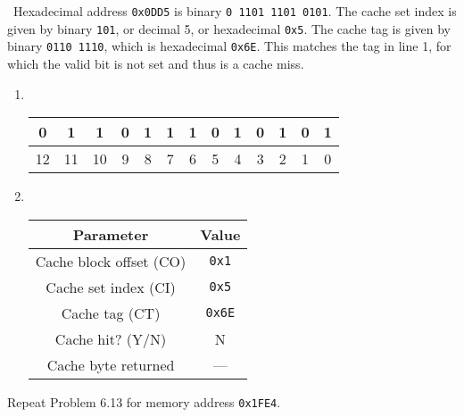 \documentclass[12pt]{article}
\newenvironment{ex}[2][Exercise]{\begin{trivlist}
		\item[\hskip \labelsep {\bfseries #1}\hskip \labelsep {\bfseries #2.}]}{\end{trivlist}}
\newenvironment{sol}[1][Solution]{\begin{trivlist}
		\item[\hskip \labelsep {\bfseries #1:}]}{\end{trivlist}}
\begin{document}
\begin{sol}
	\
	Hexadecimal address \texttt{0x0DD5} is binary \texttt{0 1101 1101 0101}. The cache
	set index is given by binary \texttt{101}, or decimal 5, or hexadecimal \texttt{0x5}.
	The cache tag is given by binary \texttt{0110 1110}, which is hexadecimal \texttt{0x6E}.
	This matches the tag in line 1, for which the valid bit is not set and thus is a cache miss.
	\begin{enumerate}[label=(\alph*)]
		\item \
		\begin{center}
			\begin{tabular}{|c|c|c|c|c|c|c|c|c|c|c|c|c|}
				\hline
				0 & 1 & 1 & 0 & 1 & 1 & 1 & 0 & 1 & 0 & 1 & 0 & 1\\
				\hline
				12 & 11 & 10 & 9 & 8 & 7 & 6 & 5 & 4 & 3 & 2 & 1 & 0
			\end{tabular}
		\end{center}
		\item \
		\begin{center}
			\begin{tabular}{cc}
				Parameter & Value\\
				\hline
				Cache block offset (CO) & \texttt{0x1}\\
				Cache set index (CI) & \texttt{0x5}\\
				Cache tag (CT) & \texttt{0x6E}\\
				Cache hit? (Y/N) & N\\
				Cache byte returned & ---
			\end{tabular}
		\end{center}
	\end{enumerate}
\end{sol}

\begin{ex}{6.15}
	Repeat Problem 6.13 for memory address \texttt{0x1FE4}.
\end{ex}
\end{document}
